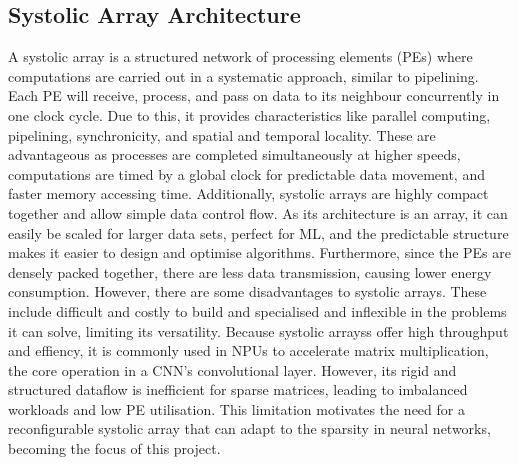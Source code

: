 \documentclass[12pt, a4paper, ukenglish]{article}
\begin{document}
    \subsection{Systolic Array Architecture} \label{sec: systolic array }
    A systolic array is a structured network of processing elements (PEs) where computations are carried out in a systematic approach, similar to pipelining. Each PE will receive, process, and pass on data to its neighbour concurrently in one clock cycle. Due to this, it provides characteristics like parallel computing, pipelining, synchronicity, and spatial and temporal locality.  These are advantageous as processes are completed simultaneously at higher speeds, computations are timed by a global clock for predictable data movement, and faster memory accessing time. Additionally, systolic arrays are highly compact together and allow simple data control flow. As its architecture is an array, it can easily be scaled for larger data sets, perfect for ML, and the predictable structure makes it easier to design and optimise algorithms. Furthermore, since the PEs are densely packed together, there are less data transmission, causing lower energy consumption. However, there are some disadvantages to systolic arrays. These include difficult and costly to build and specialised and inflexible in the problems it can solve, limiting its versatility. Because systolic arrayss offer high throughput and effiency, it is commonly used in NPUs to accelerate matrix multiplication, the core operation in a CNN's convolutional layer. However, its rigid and structured dataflow is inefficient for sparse matrices, leading to imbalanced workloads and low PE utilisation. This limitation motivates the need for a reconfigurable systolic array that can adapt to the sparsity in neural networks, becoming the focus of this project.


\end{document}

